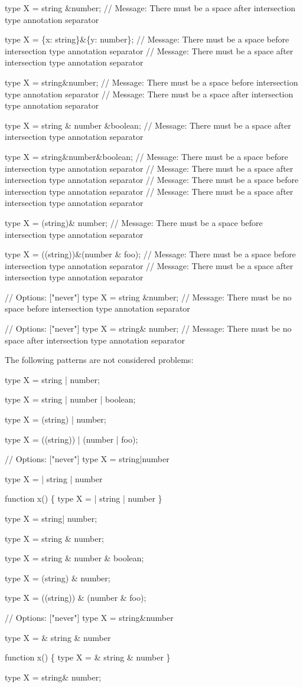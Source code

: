 \begin{DoxyCode}
type X = string &number;
// Message: There must be a space after intersection type annotation separator

type X = \{x: string\}&\{y: number\};
// Message: There must be a space before intersection type annotation separator
// Message: There must be a space after intersection type annotation separator

type X = string&number;
// Message: There must be a space before intersection type annotation separator
// Message: There must be a space after intersection type annotation separator

type X = string & number &boolean;
// Message: There must be a space after intersection type annotation separator

type X = string&number&boolean;
// Message: There must be a space before intersection type annotation separator
// Message: There must be a space after intersection type annotation separator
// Message: There must be a space before intersection type annotation separator
// Message: There must be a space after intersection type annotation separator

type X = (string)& number;
// Message: There must be a space before intersection type annotation separator

type X = ((string))&(number & foo);
// Message: There must be a space before intersection type annotation separator
// Message: There must be a space after intersection type annotation separator

// Options: ["never"]
type X = string &number;
// Message: There must be no space before intersection type annotation separator

// Options: ["never"]
type X = string& number;
// Message: There must be no space after intersection type annotation separator
\end{DoxyCode}


The following patterns are not considered problems\+:


\begin{DoxyCode}
type X = string | number;

type X = string | number | boolean;

type X = (string) | number;

type X = ((string)) | (number | foo);

// Options: ["never"]
type X = string|number

type X =
| string
| number

function x() \{
type X =
| string
| number
\}

type X = string| number;

type X = string & number;

type X = string & number & boolean;

type X = (string) & number;

type X = ((string)) & (number & foo);

// Options: ["never"]
type X = string&number

type X =
& string
& number

function x() \{
type X =
& string
& number
\}

type X = string& number;
\end{DoxyCode}


